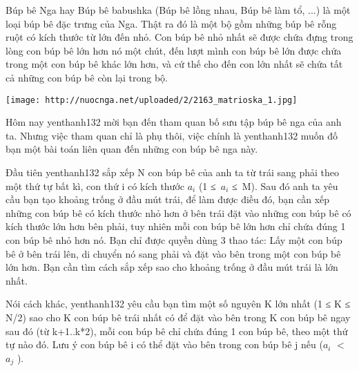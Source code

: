 Búp bê Nga hay Búp bê babushka (Búp bê lồng nhau, Búp bê làm tổ, ...) là một loại búp bê đặc trưng của Nga. Thật ra đó là một bộ gồm những búp bê rỗng ruột có kích thước từ lớn đến nhỏ. Con búp bê nhỏ nhất sẽ được chứa đựng trong lòng con búp bê lớn hơn nó một chút, đến lượt mình con búp bê lớn được chứa trong một con búp bê khác lớn hơn, và cứ thế cho đến con lớn nhất sẽ chứa tất cả những con búp bê còn lại trong bộ.


\texttt{[image: http://nuocnga.net/uploaded/2/2163\_matrioska\_1.jpg]}

   Hôm nay   yenthanh132   mời bạn đến tham quan bố sưu tập búp bê nga của anh ta. Nhưng việc tham quan chỉ là phụ thôi, việc chính là   yenthanh132   muốn đố bạn một bài toán liên quan đến những con búp bê nga này.  

   Đầu tiên   yenthanh132   sắp xếp N con búp bê của anh ta từ trái sang phải theo một thứ tự bất kì, con thứ i có kích thước $a_{i}$   (1 ≤ $a_{i}$   ≤ M). Sau đó anh ta yêu cầu bạn tạo khoảng trống ở đầu mút trái, để làm được điều đó, bạn cần xếp những con búp bê có kích thước nhỏ hơn ở bên trái đặt vào những con búp bê có kích thước lớn hơn bên phải, tuy nhiên mỗi con búp bê lớn hơn chỉ chứa đúng 1 con búp bê nhỏ hơn nó. Bạn chỉ được quyền dùng 3 thao tác: Lấy một con búp bê ở bên trái lên, di chuyển nó sang phải và       đặt vào bên trong      một con búp bê lớn hơn. Bạn cần tìm cách sắp xếp sao cho khoảng trống ở đầu mút trái là lớn nhất.  

   Nói cách khác,   yenthanh132   yêu cầu bạn tìm một số nguyên K lớn nhất (1 ≤ K ≤ N/2) sao cho K con búp bê trái nhất có để đặt vào bên trong K con búp bê ngay sau đó (từ k+1..k*2), mỗi con búp bê chỉ chứa đúng 1 con búp bê, theo một thứ tự nào đó. Lưu ý con búp bê i có thể đặt vào bên trong con búp bê j nếu ($a_{i}$   $<$ $a_{j}$   ).